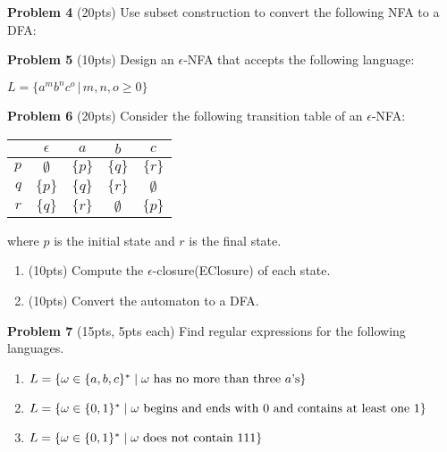 \documentclass{article}
\begin{document}
\noindent \newline \textbf{Problem 4} (20pts) Use subset construction to convert the following NFA to a DFA:
\begin{center}
\end{center}

\noindent \textbf{Problem 5} (10pts) Design an $\epsilon$-NFA that accepts the following language:
\begin{center}
    $L = \{a^{m}b^{n}c^{o}\,|\,m,n,o \geq 0\}$
\end{center}

\noindent \textbf{Problem 6} (20pts) Consider the following transition table of an $\epsilon$-NFA:
    \begin{center}
    \small
        \begin{tabular}{r||c|c|c|c}
        & $\epsilon$ & $a$ & $b$ & $c$\\ \hline\hline
        $p$ & $\emptyset$ & $\{p\}$ & $\{q\}$ & $\{r\}$\\ 
        $q$ & $\{p\}$ & $\{q\}$ & $\{r\}$ & $\emptyset$\\ 
        $r$ & $\{q\}$ & $\{r\}$ & $\emptyset$ & $\{p\}$\\ 
        \end{tabular}
    \end{center}
    where $p$ is the initial state and $r$ is the final state.
    \begin{enumerate}
        \item (10pts) Compute the $\epsilon$-closure(EClosure) of each state.
        \item (10pts) Convert the automaton to a DFA.
    \end{enumerate}
    
\noindent \textbf{Problem 7} (15pts, 5pts each) Find regular expressions for the following languages.
\begin{enumerate}
    \item $L = \{ \omega \in \{ a,b,c \}^* \mid \omega \mbox{ has no more than three $a$'s} \}$
    \item $L = \{ \omega \in \{ 0,1 \}^* \mid \omega \mbox{ begins and ends with 0 and contains at least one 1} \}$
    \item $L = \{ \omega \in \{ 0,1 \}^* \mid \omega \mbox{ does not contain 111} \}$ 
\end{enumerate}
\end{document}
